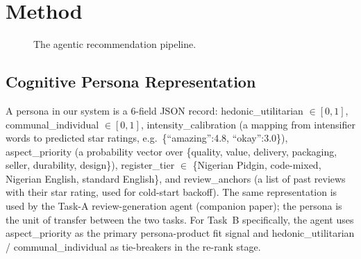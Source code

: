 \documentclass[sigconf,nonacm,balance]{acmart}
\begin{document}
\section{Method}

\begin{figure}[t]
  \centering
  \caption{The agentic recommendation pipeline. }
  \label{fig:pipeline-b}
\end{figure}

\subsection{Cognitive Persona Representation}

A persona in our system is a 6-field JSON record:
\textsf{hedonic\_utilitarian} $\in [0,1]$,
\textsf{communal\_individual} $\in [0,1]$,
\textsf{intensity\_calibration} (a mapping from intensifier words to
predicted star ratings, e.g.\ \textsf{\{``amazing'':4.8, ``okay'':3.0\}}),
\textsf{aspect\_priority} (a probability vector over
\{quality, value, delivery, packaging, seller, durability, design\}),
\textsf{register\_tier} $\in$ \{Nigerian Pidgin, code-mixed,
Nigerian English, standard English\}, and \textsf{review\_anchors}
(a list of past reviews with their star rating, used for cold-start
backoff). The same representation is used by the Task-A review-generation
agent (companion paper); the persona is the unit of transfer between
the two tasks. For Task~B specifically, the agent uses
\textsf{aspect\_priority} as the primary persona-product fit signal and
\textsf{hedonic\_utilitarian} / \textsf{communal\_individual} as
tie-breakers in the re-rank stage.
\end{document}
